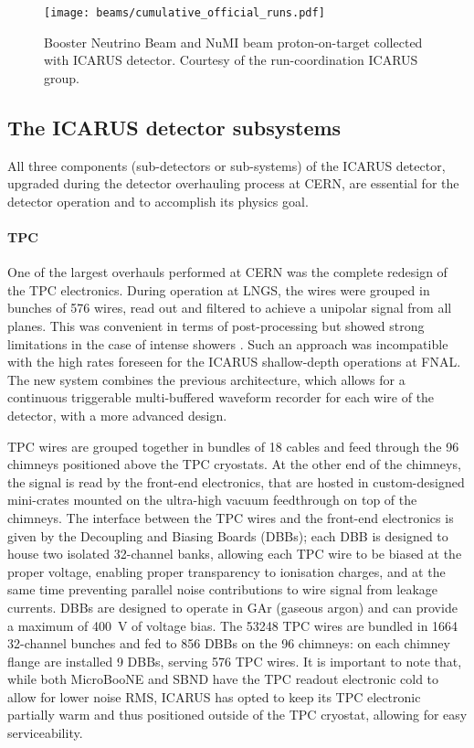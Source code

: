 \begin{figure}
    \centering
    \texttt{[image: beams/cumulative\_official\_runs.pdf]}
    \caption[BNB and NuMI collected POT]{Booster Neutrino Beam and NuMI beam proton-on-target collected with ICARUS detector. Courtesy of the run-coordination ICARUS group. }
    \label{fig:BNB_NuMI_POTplot}
\end{figure}

\subsection{The ICARUS detector subsystems} 

All three components (sub-detectors or sub-systems) of the ICARUS detector, upgraded during the detector overhauling process at CERN, are essential for the detector operation and to accomplish its physics goal.

\paragraph{TPC} One of the largest overhauls performed at CERN was the complete redesign of the TPC electronics. During operation at LNGS, the wires were grouped in bunches of 576 wires, read out and filtered to achieve a unipolar signal from all planes. This was convenient in terms of post-processing but showed strong limitations in the case of intense showers \cite{bagbyOverhaulInstallationICARUST6002021}. Such an approach was incompatible with the high rates foreseen for the ICARUS shallow-depth operations at FNAL. The new system combines the previous architecture, which allows for a continuous triggerable multi-buffered waveform recorder for each wire of the detector, with a more advanced design. 

TPC wires are grouped together in bundles of 18 cables and feed through the 96 chimneys positioned above the TPC cryostats. At the other end of the chimneys, the signal is read by the front-end electronics, that are hosted in custom-designed mini-crates mounted on the ultra-high vacuum feedthrough on top of the chimneys. The interface between the TPC wires and the front-end electronics is given by the Decoupling and Biasing Boards (DBBs); each DBB is designed to house two isolated 32-channel banks, allowing each TPC wire to be biased at the proper voltage, enabling proper transparency to ionisation charges, and at the same time preventing parallel noise contributions to wire signal from leakage currents. DBBs are designed to operate in GAr (gaseous argon) and can provide a maximum of \SI{400}{\volt} of voltage bias. The \num{53248} TPC wires are bundled in \num{1664} 32-channel bunches and fed to \num{856} DBBs on the 96 chimneys: on each chimney flange are installed 9 DBBs, serving 576 TPC wires. It is important to note that, while both MicroBooNE and SBND have the TPC readout electronic cold to allow for lower noise RMS, ICARUS has opted to keep its TPC electronic partially warm and thus positioned outside of the TPC cryostat, allowing for easy serviceability. 

